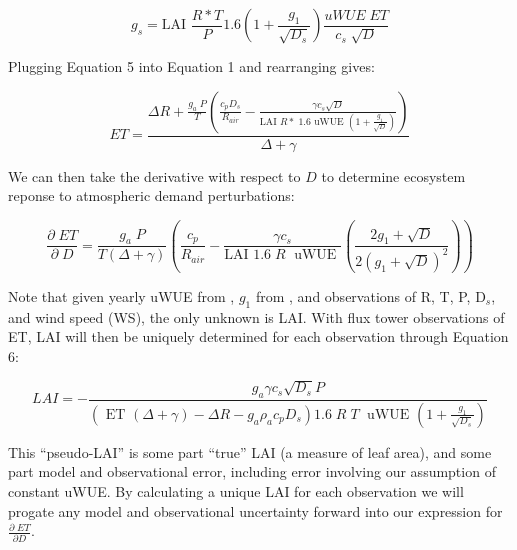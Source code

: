 \documentclass[draft,linenumbers]{agujournal}
\begin{document}
\begin{linenomath*}
  \begin{equation}
  g_s = \text{LAI } \frac{R* T}{P} 1.6 \left(1 + \frac{g_1}{\sqrt{D_{s}}}\right) \frac{uWUE \; ET}{c_s \; \sqrt{D}}
  \end{equation}
\end{linenomath*}

Plugging Equation 5 into Equation 1 and rearranging gives:

\begin{linenomath*}
  \begin{equation}
  ET = \frac{\Delta R + \frac{g_a\; P}{T} \left( \frac{ c_p D_{s}}{R_{air}} - \frac{\gamma c_s \sqrt{D} }{\text{LAI } R* \; 1.6 \text{ uWUE } (1 + \frac{g_1}{\sqrt{D}})} \right) }{ \Delta + \gamma}
  \end{equation}
\end{linenomath*}

We can then take the derivative with respect to $D$ to determine ecosystem reponse to atmospheric demand perturbations:

\begin{linenomath*}
  \begin{equation}
    \frac{\partial \;  ET}{\partial \; D} = \frac{g_a \; P}{T(\Delta + \gamma)}   \left(\frac{ c_p}{R_{air}} - \frac{\gamma c_s }{\text{LAI }1.6 \; R\; \text{ uWUE }} \left( \frac{2 g_1 + \sqrt{D}}{2 (g_1 + \sqrt{D})^2}\right) \right)
    \label{d_et}
  \end{equation}
\end{linenomath*}
Note that given yearly uWUE from \cite{Zhou_2015}, $g_1$ from \cite{Lin_2015} \citep[as presented in ][]{Franks_2017}, and observations of R, T, P, D$_s$, and wind speed (WS), the only unknown is LAI. With flux tower observations of ET, LAI will then be uniquely determined for each observation through Equation 6:

\begin{linenomath*}
  \begin{equation}
    LAI  = - \frac{g_a \gamma c_s \sqrt{D_s} P }{ \left(\text{ ET } ( \Delta + \gamma) - \Delta R - g_a \rho_a c_p D_{s}\right) 1.6 \; R\; T\; \text{ uWUE } (1 + \frac{g_1}{\sqrt{D_s}})}
    \label{lai}
  \end{equation}
\end{linenomath*}

This ``pseudo-LAI'' is some part ``true'' LAI (a measure of leaf area), and some part model and observational error, including error involving our assumption of constant uWUE. By calculating a unique LAI for each observation we will progate any model and observational uncertainty forward into our expression for $\frac{\partial \; ET}{\partial D}$. 
\end{document}
